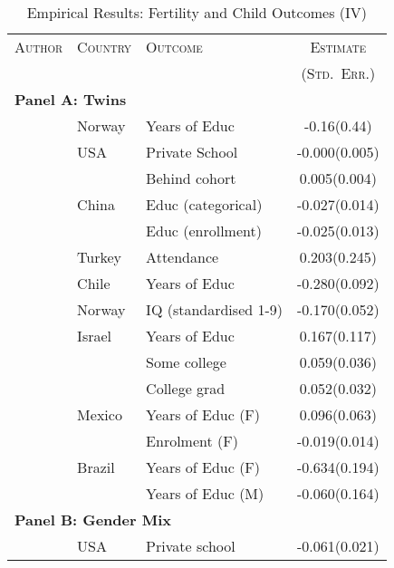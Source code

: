 \begin{table}[htpb!]
\caption{Empirical Results: Fertility and Child Outcomes (IV)}
\label{Ftab:childQQ}
\begin{tabular}{lllc} \toprule
\textsc{Author} & \textsc{Country} & \textsc{Outcome} & \textsc{Estimate} \\
                &                  &                  & \textsc{(Std.\ Err.)} \\ \midrule
\multicolumn{4}{l}{\textbf{Panel A: Twins}} \\
\citet{Blacketal2005}            &Norway   &Years of Educ        &-0.16(0.44) \\
\citet{Caceres2006}              &USA      &Private School       &-0.000(0.005)\\
                                 &         &Behind cohort        & 0.005(0.004)\\
\citet{Lietal2008}               &China    &Educ (categorical)   &-0.027(0.014)\\
                                 &         &Educ (enrollment)    &-0.025(0.013)\\
\citet{Dayiogluetal2009}         &Turkey   &Attendance           & 0.203(0.245)\\
\citet{Sanhueza2009}             &Chile    &Years of Educ        &-0.280(0.092)\\
\citet{Blacketal2010}            &Norway   &IQ (standardised 1-9)&-0.170(0.052)\\
\citet{Angristetal2010}          &Israel   &Years of Educ        & 0.167(0.117)\\
                                 &         &Some college         & 0.059(0.036)\\
                                 &         &College grad         & 0.052(0.032)\\
\citet{FitzsimonsMalde2010}      &Mexico   &Years of Educ (F)    & 0.096(0.063)\\
                                 &         &Enrolment (F)        &-0.019(0.014)\\
\citet{SouzaPonczek2012}         &Brazil   &Years of Educ (F)    &-0.634(0.194)\\
                                 &         &Years of Educ (M)    &-0.060(0.164)\\ \midrule
\multicolumn{4}{l}{\textbf{Panel B: Gender Mix}} \\
\citet{ConleyGlauber2006}        &USA      &Private school       &-0.061(0.021) \\

\end{tabular}
\end{table}
